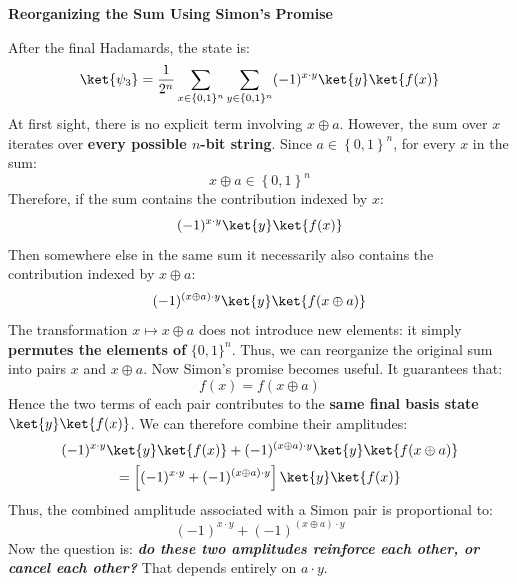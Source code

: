 \highspace
\begin{flushleft}
    \textcolor{Green3}{ \textbf{Reorganizing the Sum Using Simon's Promise}}
\end{flushleft}
After the final Hadamards, the state is:
\begin{equation*}
    \ket{\psi_3}
    =
    \frac{1}{2^n}
    \sum_{x\in\{0,1\}^n}
    \sum_{y\in\{0,1\}^n}
    (-1)^{x \cdot y}
    \ket{y} \ket{f(x)}
\end{equation*}
At first sight, there is no explicit term involving $x\oplus a$. However, the sum over $x$ iterates over \textbf{every possible $n$-bit string}. Since $a \in \left\{0, 1\right\}^{n}$, for every $x$ in the sum:
\begin{equation*}
    x \oplus a \in \left\{0, 1\right\}^{n}
\end{equation*}
Therefore, if the sum contains the contribution indexed by $x$:
\begin{equation*}
    (-1)^{x \cdot y} \ket{y} \ket{f(x)}
\end{equation*}
Then somewhere else in the same sum it necessarily also contains the contribution indexed by $x\oplus a$:
\begin{equation*}
    (-1)^{(x\oplus a) \cdot y} \ket{y} \ket{f(x\oplus a)}
\end{equation*}
The transformation $x \mapsto x \oplus a$ does not introduce new elements: it simply \textbf{permutes the elements of} $\{0,1\}^{n}$. Thus, we can reorganize the original sum into pairs $x$ and $x \oplus a$. Now Simon's promise becomes useful. It guarantees that:
\begin{equation*}
    f(x) = f(x \oplus a)
\end{equation*}
Hence the two terms of each pair contributes to the \textbf{same final basis state} $\ket{y} \ket{f(x)}$. We can therefore combine their amplitudes:
\begin{gather*}
    (-1)^{x \cdot y} \ket{y} \ket{f(x)} + (-1)^{(x\oplus a) \cdot y} \ket{y} \ket{f(x\oplus a)} \\
    = \left[(-1)^{x \cdot y} + (-1)^{(x\oplus a) \cdot y}\right] \ket{y} \ket{f(x)}
\end{gather*}
Thus, the combined amplitude associated with a Simon pair is proportional to:
\begin{equation*}
    (-1)^{x \cdot y} + (-1)^{(x\oplus a) \cdot y}
\end{equation*}
Now the question is: \emph{\textbf{do these two amplitudes reinforce each other, or cancel each other?}} That depends entirely on $a \cdot y$.

